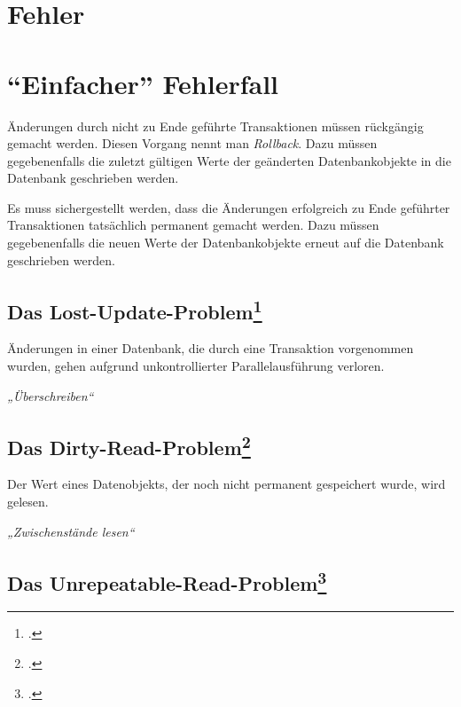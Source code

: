 \documentclass{lehramt-informatik-haupt}
\begin{document}
%

\section{Fehler}

\section{“Einfacher” Fehlerfall}

Änderungen durch nicht zu Ende geführte Transaktionen müssen rückgängig
gemacht werden. Diesen Vorgang nennt man \emph{Rollback}. Dazu müssen
gegebenenfalls die zuletzt gültigen Werte der geänderten
Datenbankobjekte in die Datenbank geschrieben werden.

Es muss sichergestellt werden, dass die Änderungen erfolgreich zu Ende
geführter Transaktionen tatsächlich permanent gemacht werden. Dazu
müssen gegebenenfalls die neuen Werte der Datenbankobjekte erneut auf
die Datenbank geschrieben werden.

%

\subsection{Das Lost-Update-Problem\footcite{wiki:verlorenes-update}}

Änderungen in einer Datenbank, die durch eine Transaktion vorgenommen
wurden, gehen aufgrund unkontrollierter Parallelausführung verloren.

\emph{„Überschreiben“}

%

\subsection{Das Dirty-Read-Problem\footcite{wiki:schreib-lese-konflikt}}

Der Wert eines Datenobjekts, der noch nicht permanent gespeichert wurde,
wird gelesen.

\emph{„Zwischenstände lesen“}

%

\subsection{Das Unrepeatable-Read-Problem\footcite{wiki:nichtwiederholbares-lesen}}
\end{document}
